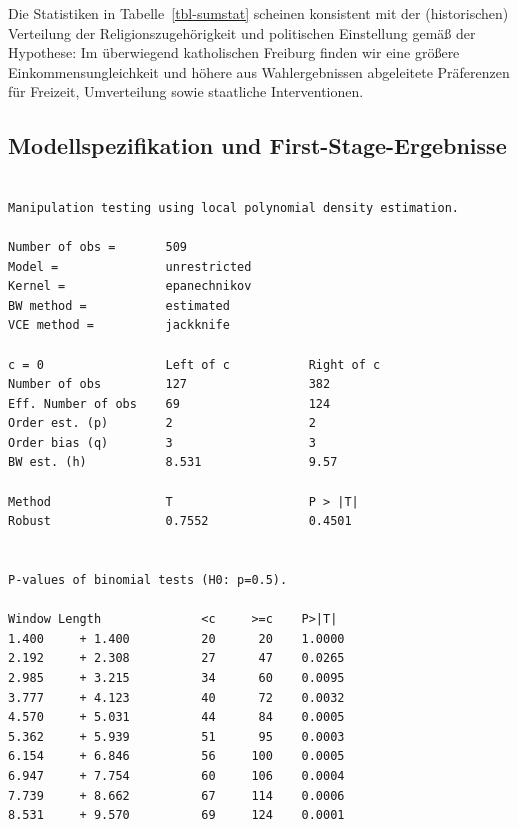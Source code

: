 \documentclass[
  a4paper,
  DIV=11,
  oneside]{scrreprt}
\newenvironment{Shaded}{\begin{snugshade}}{\end{snugshade}}
\newcommand{\AttributeTok}[1]{\textcolor[rgb]{0.40,0.45,0.13}{#1}}
\newcommand{\DecValTok}[1]{\textcolor[rgb]{0.68,0.00,0.00}{#1}}
\newcommand{\FunctionTok}[1]{\textcolor[rgb]{0.28,0.35,0.67}{#1}}
\newcommand{\NormalTok}[1]{\textcolor[rgb]{0.00,0.23,0.31}{#1}}
\newcommand{\OtherTok}[1]{\textcolor[rgb]{0.00,0.23,0.31}{#1}}
\newcommand{\SpecialCharTok}[1]{\textcolor[rgb]{0.37,0.37,0.37}{#1}}
\newcommand{\StringTok}[1]{\textcolor[rgb]{0.13,0.47,0.30}{#1}}
\begin{document}
\endgroup

Die Statistiken in Tabelle~\ref{tbl-sumstat} scheinen konsistent mit der
(historischen) Verteilung der Religionszugehörigkeit und politischen
Einstellung gemäß der Hypothese: Im überwiegend katholischen Freiburg
finden wir eine größere Einkommensungleichkeit und höhere aus
Wahlergebnissen abgeleitete Präferenzen für Freizeit, Umverteilung sowie
staatliche Interventionen.

\subsection{Modellspezifikation und
First-Stage-Ergebnisse}\label{modellspezifikation-und-first-stage-ergebnisse}

\begin{Shaded}
\end{Shaded}

\begin{verbatim}

Manipulation testing using local polynomial density estimation.

Number of obs =       509
Model =               unrestricted
Kernel =              epanechnikov
BW method =           estimated
VCE method =          jackknife

c = 0                 Left of c           Right of c          
Number of obs         127                 382                 
Eff. Number of obs    69                  124                 
Order est. (p)        2                   2                   
Order bias (q)        3                   3                   
BW est. (h)           8.531               9.57                

Method                T                   P > |T|             
Robust                0.7552              0.4501              


P-values of binomial tests (H0: p=0.5).

Window Length              <c     >=c    P>|T|
1.400     + 1.400          20      20    1.0000
2.192     + 2.308          27      47    0.0265
2.985     + 3.215          34      60    0.0095
3.777     + 4.123          40      72    0.0032
4.570     + 5.031          44      84    0.0005
5.362     + 5.939          51      95    0.0003
6.154     + 6.846          56     100    0.0005
6.947     + 7.754          60     106    0.0004
7.739     + 8.662          67     114    0.0006
8.531     + 9.570          69     124    0.0001
\end{verbatim}
\end{document}
